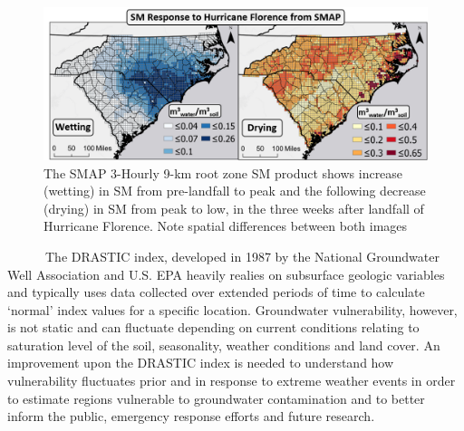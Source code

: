 \documentclass[
]{book}
\begin{document}
\begin{figure}
\includegraphics[width=1\linewidth]{img/florence} \caption{The SMAP 3-Hourly 9-km root zone SM product shows increase (wetting) in SM from pre-landfall to peak and the following decrease (drying) in SM from peak to low, in the three weeks after landfall of Hurricane Florence. Note spatial differences between both images}\label{fig:florence}
\end{figure}

~~~~~~The DRASTIC index, developed in 1987 by the National Groundwater Well Association and U.S. EPA heavily realies on subsurface geologic variables and typically uses data collected over extended periods of time to calculate `normal' index values for a specific location. Groundwater vulnerability, however, is not static and can fluctuate depending on current conditions relating to saturation level of the soil, seasonality, weather conditions and land cover. An improvement upon the DRASTIC index is needed to understand how vulnerability fluctuates prior and in response to extreme weather events in order to estimate regions vulnerable to groundwater contamination and to better inform the public, emergency response efforts and future research.
\end{document}
